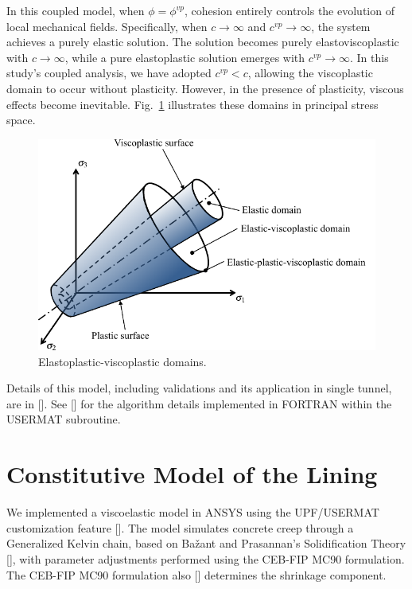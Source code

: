\documentclass[a4paper,fleqn]{cas-sc}
\begin{document}
In this coupled model, when $\phi=\phi^{vp}$, cohesion entirely controls the evolution of local mechanical fields. Specifically, when  $c \rightarrow \infty$ and $c^{vp} \rightarrow \infty$, the system achieves a purely elastic solution. The solution becomes purely elastoviscoplastic with $c \rightarrow \infty$, while a pure elastoplastic solution emerges with $c^{vp} \rightarrow \infty$. In this study's coupled analysis, we have adopted $c^{vp} < c$, allowing the viscoplastic domain to occur without plasticity. However, in the presence of plasticity, viscous effects become inevitable. Fig.~\ref{epvpdomains} illustrates these domains in principal stress space.
\begin{figure}[h!]
	\centering
	\includegraphics[scale=0.8]{Elastic-plastic-viscoplastic domains.pdf}
	\caption{Elastoplastic-viscoplastic domains.}
	\label{epvpdomains}
\end{figure}

Details of this model, including validations and its application in single tunnel, are in []. See [] for the algorithm details implemented in FORTRAN within the USERMAT subroutine.

\section{Constitutive Model of the Lining}\label{}

We implemented a viscoelastic model in ANSYS using the UPF/USERMAT customization feature []. The model simulates concrete creep through a Generalized Kelvin chain, based on Bažant and Prasannan's Solidification Theory [], with parameter adjustments performed using the CEB-FIP MC90 formulation. The CEB-FIP MC90 formulation also [] determines the shrinkage component. 
\end{document}

